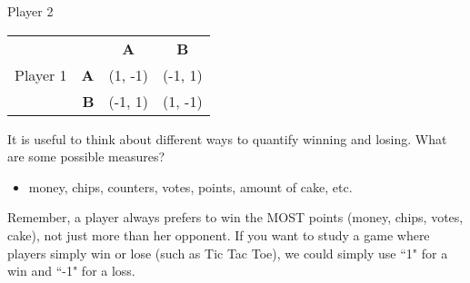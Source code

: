 \hspace{1.2in}Player 2

\begin{tabular}{l|r|c|c|}\cline{2-4}
&&\textbf{A}&\textbf{B}\\ \cline{2-4}
Player 1&\textbf{A} &(1, -1)&(-1, 1)\\ \cline{2-4}
&\textbf{B} &(-1, 1)&(1, -1)\\ \cline{2-4}

\end{tabular}
\medskip

It is useful to think about different ways to quantify winning and losing. What are some possible measures? 
\begin{itemize}
\item money, chips, counters, votes, points, amount of cake, etc.
\end{itemize}

Remember, a player always prefers to win the MOST points (money, chips, votes, cake), not just more than her opponent. If you want to study a game where players simply win or lose (such as Tic Tac Toe), we could simply use ``1" for a win and ``-1" for a loss. 

 